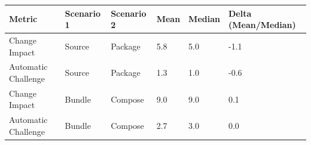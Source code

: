 \begin{tabular*}{\tblwidth}{@{} LLLLLL@{} }
\toprule
Metric & Scenario 1 & Scenario 2 & Mean & Median & Delta (Mean/Median)\\
\midrule
Change Impact & Source & Package & 5.8 & 5.0 & -1.1 \\
Automatic Challenge & Source & Package & 1.3 & 1.0 & -0.6 \\
Change Impact & Bundle & Compose & 9.0 & 9.0 & 0.1 \\
Automatic Challenge & Bundle & Compose & 2.7 & 3.0 & 0.0 \\
\bottomrule
\end{tabular*}